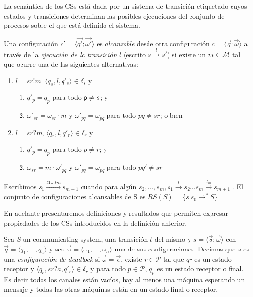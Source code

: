 La semántica de los CSs está dada por un sistema de transición etiquetado cuyos estados y transiciones determinan las posibles ejecuciones del conjunto de procesos sobre el que está definido el sistema.


\begin{definition}
\label{def:estadosyconf}
  Una configuración $c' = \langle \overrightarrow{q'} ; \overrightarrow{\omega'} \rangle$ es \emph{alcanzable} desde otra
  configuración $c = \langle \overrightarrow{q} ; \overrightarrow{\omega} \rangle$ a través de la \emph{ejecución de la transición} $l$ (escrito $s \overset{l}{\rightarrow} s'$) si existe un $m \in \mathcal{M}$ tal que ocurre una de las siguientes alternativas:
	\begin{enumerate}
		\item $l = sr!m$, $\langle q_s, l,  q'_s\rangle \in \delta_s$ y 
			\begin{enumerate}
				\item $q'_p = q_p$ para todo $\mathsf{p} \neq s$; y
				\item $\omega'_{sr} = \omega_{sr} \cdot m$ y  $\omega'_{pq} = \omega_{pq}$ para todo $pq \neq sr$; o bien
			\end{enumerate}
		\item $l = sr?m$, $\langle q_r, l,  q'_r\rangle \in \delta_r$ y 
			\begin{enumerate}
			\item $q'_{p} = q_{p}$ para todo $p \neq r$; y
				\item $\omega_{sr} = m \cdot \omega'_{pq}$ y $\omega'_{pq} = \omega_{pq}$ para todo $pq' \neq sr$
			\end{enumerate}
	\end{enumerate}
Escribimos $ s_1 \overset{t1...tm}{\rightarrow} s_{m+1}$ cuando para algún $s_2,...,s_m, s_1\overset{t}{\rightarrow} s_2...s_m\overset{t_m}{\rightarrow} s_{m+1} $ . El conjunto de configuraciones alcanzables de S es $RS(S) = \{s | s_0 \rightarrow^*S \}$
\end{definition}

En adelante presentaremos definiciones y resultados que permiten expresar propiedades de los CSs introducidos en la definición anterior.


\begin{definition}[Deadlock]Sea $S$ un communicating system, una transición $t$ del mismo y $s= \langle \overrightarrow{q} ; \overrightarrow{\omega} \rangle$ con $\overrightarrow{q}= \langle q_1, \ldots, q_n \rangle$ y sea $\overrightarrow{\omega}= \langle \omega_1, \ldots, \omega_n \rangle$ una de sus configuraciones. Decimos que $s$ es una \textit{configuración de deadlock} si $\overrightarrow{\omega} = \overrightarrow{\epsilon}$, existe $r \in \mathcal{P}$ tal que $qr$ es un estado receptor y $\langle q_r,sr?a,q'_r \rangle \in \delta_r$ y para todo $p \in \mathcal{P}$, $q_p$ es un estado receptor o final. Es decir todos los canales están vacíos, hay al menos una máquina esperando un mensaje y todas las otras máquinas están en un estado final o receptor.
\end{definition}

